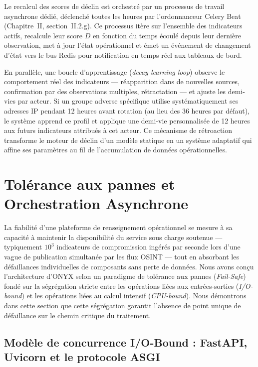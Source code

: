 Le recalcul des scores de déclin est orchestré par un processus de travail asynchrone dédié, déclenché toutes les heures par l'ordonnanceur Celery Beat (Chapitre~II, section~II.2.g). Ce processus itère sur l'ensemble des indicateurs actifs, recalcule leur score $D$ en fonction du temps écoulé depuis leur dernière observation, met à jour l'état opérationnel et émet un événement de changement d'état vers le bus Redis pour notification en temps réel aux tableaux de bord.

En parallèle, une boucle d'apprentissage (\textit{decay learning loop}) observe le comportement réel des indicateurs --- réapparition dans de nouvelles sources, confirmation par des observations multiples, rétractation --- et ajuste les demi-vies par acteur. Si un groupe adverse spécifique utilise systématiquement ses adresses IP pendant 12 heures avant rotation (au lieu des 36 heures par défaut), le système apprend ce profil et applique une demi-vie personnalisée de 12 heures aux futurs indicateurs attribués à cet acteur. Ce mécanisme de rétroaction transforme le moteur de déclin d'un modèle statique en un système adaptatif qui affine ses paramètres au fil de l'accumulation de données opérationnelles.



\section{Tolérance aux pannes et Orchestration Asynchrone}

La fiabilité d'une plateforme de renseignement opérationnel se mesure à sa capacité à maintenir la disponibilité du service sous charge soutenue --- typiquement $10^3$ indicateurs de compromission ingérés par seconde lors d'une vague de publication simultanée par les flux OSINT --- tout en absorbant les défaillances individuelles de composants sans perte de données. Nous avons conçu l'architecture d'ONYX selon un paradigme de tolérance aux pannes (\textit{Fail-Safe}) fondé sur la ségrégation stricte entre les opérations liées aux entrées-sorties (\textit{I/O-bound}) et les opérations liées au calcul intensif (\textit{CPU-bound}). Nous démontrons dans cette section que cette ségrégation garantit l'absence de point unique de défaillance sur le chemin critique du traitement.

\subsection{Modèle de concurrence I/O-Bound : FastAPI, Uvicorn et le protocole ASGI}

